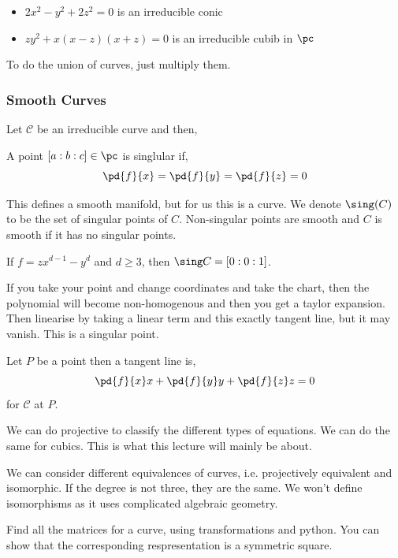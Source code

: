\documentclass{article}
\begin{document}
\begin{itemize}
  \item $2x^2 - y^2 + 2z^2 = 0$ is an irreducible conic
  \item $zy^2 + x(x-  z)(x + z) = 0$ is an irreducible cubib in $\pc$
\end{itemize}

To do the union of curves, just multiply them.

\subsubsection{Smooth Curves}

Let $\mathcal{C}$ be an irreducible curve and then,

\begin{ndefi}[Singular]
  A point $[a : b : c] \in \pc$ is singlular if,
  $$ \pd{f}{x} = \pd{f}{y} = \pd{f}{z} = 0 $$
\end{ndefi}
This defines a smooth manifold, but for us this is a curve. We denote $\sing (C)$ to be the set of singular points of $C$. Non-singular points are smooth and $C$ is smooth if it has no singular points.

\begin{eg}
  If $f = zx^{d - 1} - y^d$ and $d \ge 3$, then $\sing C = [0 : 0 : 1]$.
\end{eg}

If you take your point and change coordinates and take the chart, then the polynomial will become non-homogenous and then you get a taylor expansion. Then linearise by taking a linear term and this exactly tangent line, but it may vanish. This is a singular point.

Let $P$ be a point then a tangent line is,
$$ \pd{f}{x}x + \pd{f}{y}y + \pd{f}{z}z = 0 $$
for $\mathcal{C}$ at $P$.

We can do projective to classify the different types of equations. We can do the same for cubics. This is what this lecture will mainly be about.

We can consider different equivalences of curves, i.e. projectively equivalent and isomorphic. If the degree is not three, they are the same. We won't define isomorphisms as it uses complicated algebraic geometry.

\begin{ex}
  Find all the matrices for a curve, using transformations and python. You can show that the corresponding respresentation is a symmetric square.
\end{ex}
\end{document}
